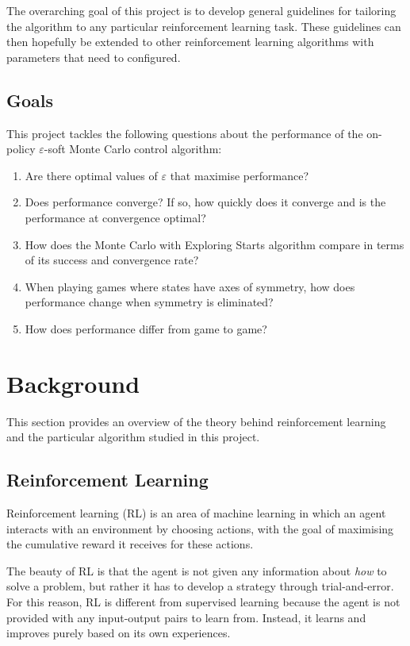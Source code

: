 \documentclass[11pt,a4paper,twoside,openright]{report}
\begin{document}
The overarching goal of this project is to develop general guidelines for tailoring the algorithm to any particular reinforcement learning task. These guidelines can then hopefully be extended to other reinforcement learning algorithms with parameters that need to configured.


\section{Goals}
\label{sec:goals}

This project tackles the following questions about the performance of the on-policy $\varepsilon$-soft Monte Carlo control algorithm:

\begin{enumerate}
	\item Are there optimal values of $\varepsilon$ that maximise performance?
	\item Does performance converge? If so, how quickly does it converge and is the performance at convergence optimal?
    \item How does the Monte Carlo with Exploring Starts algorithm \cite{rl-book} compare in terms of its success and convergence rate?
	\item When playing games where states have axes of symmetry, how does performance change when symmetry is eliminated?
	\item How does performance differ from game to game?
\end{enumerate}



\chapter{Background}

This section provides an overview of the theory behind reinforcement learning and the particular algorithm studied in this project.

\section{Reinforcement Learning}
\label{sec:RL}

Reinforcement learning (RL) is an area of machine learning in which an agent interacts with an environment by choosing actions, with the goal of maximising the cumulative reward it receives for these actions.

The beauty of RL is that the agent is not given any information about \emph{how} to solve a problem, but rather it has to develop a strategy through trial-and-error. For this reason, RL is different from supervised learning because the agent is not provided with any input-output pairs to learn from. Instead, it learns and improves purely based on its own experiences.
\end{document}
